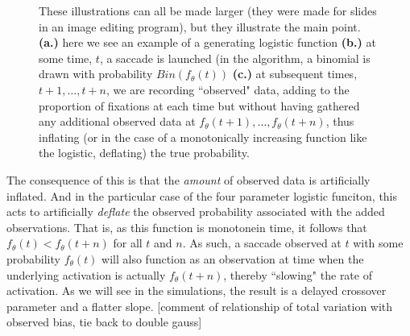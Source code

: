 \documentclass{article}
\begin{document}
\begin{figure}[H]
    \centering
    \caption{These illustrations can all be made larger (they were made for slides in an image editing program), but they illustrate the main point. \textbf{(a.)} here we see an example of a generating logistic function \textbf{(b.)} at some time, $t$, a saccade is launched (in the algorithm, a binomial is drawn with probability $Bin(f_{\theta}(t))$ \textbf{(c.)} at subsequent times, $t+1, \dots, t+n$, we are recording ``observed" data, adding to the proportion of fixations at each time but without having gathered any additional observed data at $f_{\theta}(t+1), \dots,f_{\theta}(t+n)$, thus inflating (or in the case of a monotonically increasing function like the logistic, deflating) the true probability. }
\label{fig:folly_of_fixation}
\end{figure}

The consequence of this is that the \textit{amount} of observed data is artificially inflated. And in the particular case of the four parameter logistic funciton, this acts to artificially \textit{deflate} the observed probability associated with the added observations. That is, as this function is monotonein time, it follows that $f_{\theta}(t) < f_{\theta}(t+n)$ for all $t$ and $n$. As such, a saccade observed at $t$ with some probability $f_{\theta}(t)$ will also function as an observation at time when the underlying activation is actually $f_{\theta}(t+n)$, thereby ``slowing" the rate of activation. As we will see in the simulations, the result is a delayed crossover parameter and a flatter slope. [comment of relationship of total variation with observed bias, tie back to double gauss]
\end{document}
